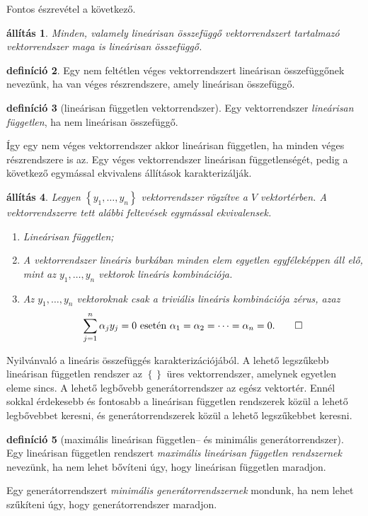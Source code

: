 \documentclass[9pt, showtrims]{memoir}
\makeatletter
\renewenvironment{proof}[1][\proofname]
    {\par\pushQED{\qed}%
    \normalfont \topsep6\p@\@plus6\p@\relax
    \trivlist
    \item[\hskip\labelsep
        \itshape
    #1\@addpunct{:}]\ignorespaces}
    {\popQED\endtrivlist\@endpefalse}
\theoremstyle{plain}
\newtheorem{proposition}{állítás}[section]
\theoremstyle{remark}
\theoremstyle{definition}
\newtheorem{definition}[proposition]{definíció}
\makeatother
\begin{document}
Fontos észrevétel a következő.
\begin{proposition}
    Minden, 
    valamely lineárisan összefüggő vektorrendszert tartalmazó vektorrendszer maga is lineárisan összefüggő.
\end{proposition}
\begin{definition}
    Egy nem feltétlen véges vektorrendszert lineárisan összefüggőnek nevezünk,
    ha van véges részrendszere, amely lineárisan összefüggő.
\end{definition}
\begin{definition}[lineárisan független vektorrendszer]
    Egy vektorrendszer \emph{lineárisan független}, ha nem lineárisan összefüggő.
\end{definition}
Így egy nem véges vektorrendszer akkor lineárisan független, ha minden véges részrendszere is az.
Egy véges vektorrendszer lineárisan függetlenségét, pedig a következő egymással ekvivalens állítások karakterizálják.
\begin{proposition}
    Legyen $\left\{ y_1,\dots,y_n \right\}$ vektorrendszer rögzítve a $V$ vektortérben.
    A vektorrendszerre tett alábbi feltevések egymással ekvivalensek.
    \begin{enumerate}
        \item Lineárisan független;
        \item A vektorrendszer lineáris burkában minden elem egyetlen egyféleképpen áll elő,
            mint az $y_1,\dots,y_n$ vektorok lineáris kombinációja.
        \item Az $y_1,\dots,y_n$ vektoroknak csak a \emph{triviális lineáris kombinációja} zérus,
            azaz
            \[
                \sum_{j=1}^n\alpha_jy_j=0\text{ esetén }\alpha_1=\alpha_2=\dots=\alpha_n=0.\qedhere
            \]
    \end{enumerate}
\end{proposition}
\begin{proof}
    Nyilvánvaló a lineáris összefüggés karakterizációjából.
\end{proof}
A lehető legszűkebb lineárisan független rendszer az $\left\{  \right\}$ üres vektorrendszer,
amelynek egyetlen eleme sincs.
A lehető legbővebb generátorrendszer az egész vektortér. 
Ennél sokkal érdekesebb és fontosabb a lineárisan független rendszerek közül a lehető legbővebbet keresni,
és generátorrendszerek közül a lehető legszűkebbet keresni.
\begin{definition}[maximális lineárisan független-- és minimális generátorrendszer]
    Egy lineárisan független rendszert \emph{maximális lineárisan független rendszernek} nevezünk,
    ha nem lehet bővíteni úgy, hogy lineárisan független maradjon.

    Egy generátorrendszert \emph{minimális generátorrendszernek} mondunk, ha nem lehet szűkíteni úgy,
    hogy generátorrendszer maradjon.
\end{definition}
\end{document}
